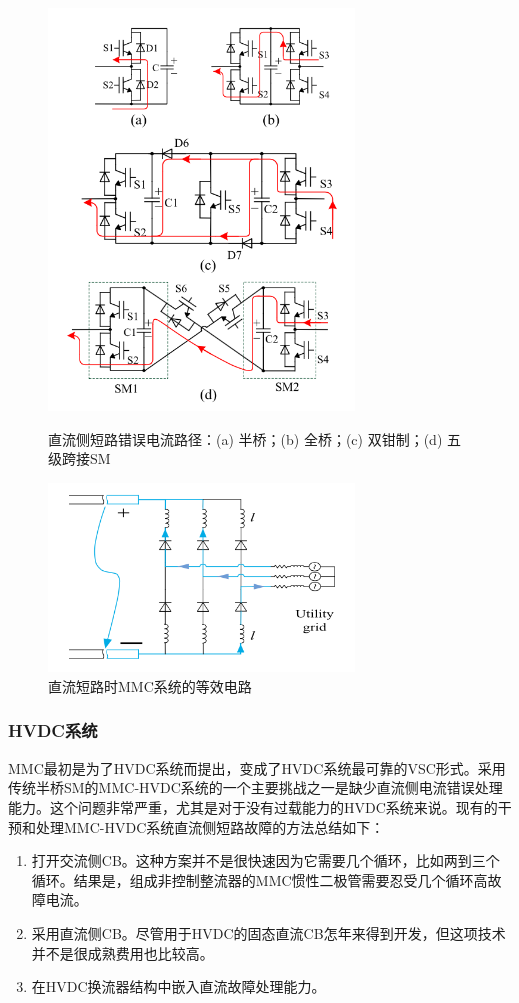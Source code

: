 \begin{figure}[H]
\begin{minipage}[t]{0.5\linewidth}
\centering
\includegraphics[width=3.2in]{images/Paper_Fig_7.png}
\setcaptionwidth{2.5in}
\caption{直流侧短路错误电流路径：\quad (a) \quad 半桥；\quad (b) \quad 全桥；\quad (c) \quad 双钳制；\quad (d) \quad 五级跨接SM}
\end{minipage}%
\begin{minipage}[t]{0.5\linewidth}
\centering
\includegraphics[width=3.2in]{images/Paper_Fig_8.png}
\setcaptionwidth{2.5in}
\caption{直流短路时MMC系统的等效电路}
\end{minipage}
\end{figure}  
  
  \subsubsection{HVDC系统}
  
  MMC最初是为了HVDC系统而提出，变成了HVDC系统最可靠的VSC形式。采用传统半桥SM的MMC-HVDC系统的一个主要挑战之一是缺少直流侧电流错误处理能力。这个问题非常严重，尤其是对于没有过载能力的HVDC系统来说。现有的干预和处理MMC-HVDC系统直流侧短路故障的方法总结如下：
  \begin{enumerate}[1)]
  \item 打开交流侧CB。这种方案并不是很快速因为它需要几个循环，比如两到三个循环。结果是，组成非控制整流器的MMC惯性二极管需要忍受几个循环高故障电流。
  \item 采用直流侧CB。尽管用于HVDC的固态直流CB怎年来得到开发，但这项技术并不是很成熟费用也比较高。
  \item 在HVDC换流器结构中嵌入直流故障处理能力。
  \end{enumerate}
  
